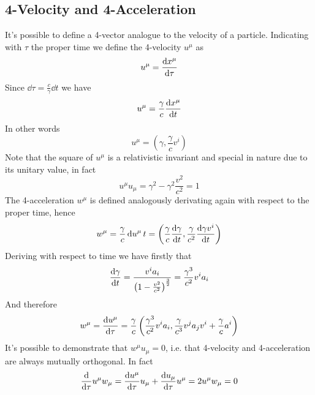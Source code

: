 \documentclass[../admech.tex]{subfiles}
\begin{document}
\subsection{4-Velocity and 4-Acceleration}
It's possible to define a 4-vector analogue to the velocity of a particle. Indicating with $\tau$ the proper time we define the 4-velocity $u^\mu$ as
\begin{equation}
	u^\mu=\dv{x^\mu}{\tau}
	\label{eq:4velocity}
\end{equation}
Since $\dd\tau=\frac{c}{\gamma}\dd t$ we have
\begin{equation*}
	u^\mu=\frac{\gamma}{c}\dv{x^\mu}{t}
\end{equation*}
In other words
\begin{equation*}
	u^\mu=\left(\gamma,\frac{\gamma}{c}v^i\right)
\end{equation*}
Note that the square of $u^\mu$ is a relativistic invariant and special in nature due to its unitary value, in fact
\begin{equation*}
	u^\mu u_\mu=\gamma^2-\gamma^2\frac{v^2}{c^2}=1
\end{equation*}
The 4-acceleration $w^\mu$ is defined analogously derivating again with respect to the proper time, hence
\begin{equation}
	w^\mu=\frac{\gamma}{c}\dd{u^\mu}{t}=\left( \frac{\gamma}{c}\dv{\gamma}{t},\frac{\gamma}{c^2}\dv{\gamma v^i}{t} \right)
	\label{eq:4acceleration}
\end{equation}
Deriving with respect to time we have firstly that
\begin{equation*}
	\dv{\gamma}{t}=\frac{v^ia_i}{\left( 1-\frac{v^2}{c^2} \right)^{\frac{3}{2}}}=\frac{\gamma^3}{c^2}v^ia_i
\end{equation*}
And therefore
\begin{equation}
	w^\mu=\dv{u^\mu}{\tau}=\frac{\gamma}{c}\left( \frac{\gamma^3}{c^2}v^ia_i,\frac{\gamma}{c^3}v^ja_jv^i+\frac{\gamma}{c}a^i \right)
	\label{eq:4acccomp}
\end{equation}
It's possible to demonstrate that $w^\mu u_\mu=0$, i.e. that 4-velocity and 4-acceleration are always mutually orthogonal. In fact
\begin{equation*}
	\dv{\tau}u^\mu w_\mu=\dv{u^\mu}{\tau}u_\mu+\dv{u_\mu}{\tau}u^\mu=2u^\mu w_\mu=0
\end{equation*}
\end{document}
